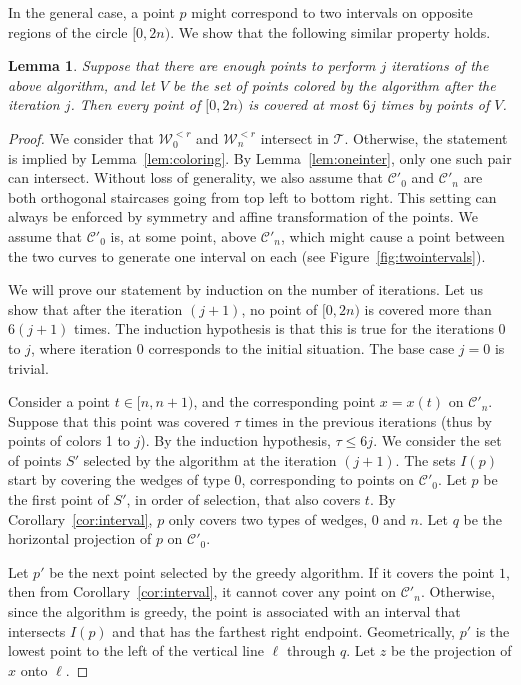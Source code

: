 \documentclass[english,11pt]{article}
\newtheorem{lemma}{Lemma}
\newcommand{\bigc}{\mathcal C}
\newcommand{\bigt}{\mathcal T}
\newcommand{\bigw}{\mathcal W}
\begin{document}
In the general case, a point $p$ might correspond to two intervals on opposite regions of the circle $[0,2n)$. We show that the following similar property holds.
\begin{lemma}
\label{lem:gen-coloring}
Suppose that there are enough points to perform $j$ iterations of the above algorithm, and let $V$ be the set of points colored by the algorithm after the iteration $j$. Then every point of $[0, 2n)$ is covered at most $6j$ times by points of $V$.
\end{lemma}
\begin{proof}
We consider that $\bigw_0^{<r}$ and $\bigw_n^{<r}$ intersect in $\bigt$. Otherwise, the statement is implied by Lemma~\ref{lem:coloring}. By Lemma~\ref{lem:oneinter}, only one such pair can intersect. Without loss of generality, we also assume that $\bigc'_0$ and $\bigc'_n$ are both orthogonal staircases going from top left to bottom right. This setting can always be enforced by symmetry and affine transformation of the points. We assume that $\bigc'_0$ is, at some point, above $\bigc'_n$, which might cause a point between the two curves to generate one interval on each (see Figure~\ref{fig:twointervals}).

We will prove our statement by induction on the number of iterations. Let us show that after the iteration $(j{+}1)$, no point of $[0,2n)$ is covered more than $6(j{+}1)$ times. The induction hypothesis is that this is true for the iterations 0 to $j$, where iteration $0$ corresponds to the initial situation. The base case $j=0$ is trivial.

Consider a point $t\in [n, n{+}1)$, and the corresponding point $x=x(t)$ on  $\bigc'_n$. Suppose that this point was covered $\tau$ times in the previous iterations (thus by points of colors 1 to $j$). By the induction hypothesis, $\tau \leq 6j$.
We consider the set of points $S'$ selected by the algorithm at the iteration $(j{+}1)$. The sets $I(p)$ start by covering the wedges of type 0, corresponding to points on $\bigc'_0$. Let $p$ be the first point of $S'$, in order of selection, that also covers $t$. By Corollary~\ref{cor:interval}, $p$ only covers two types of wedges, 0 and $n$. Let $q$ be the horizontal projection of $p$ on $\bigc'_0$.

Let $p'$ be the next point selected by the greedy algorithm. If it covers the point $1$, then from Corollary~\ref{cor:interval}, it cannot cover any point on $\bigc'_n$. Otherwise, since the algorithm is greedy, the point is associated with an interval that intersects $I(p)$ and that has the farthest right endpoint. Geometrically, $p'$ is the lowest point to the left of the vertical line $\ell$ through $q$. Let $z$ be the projection of $x$ onto $\ell$.
   

\end{proof}
\end{document}
